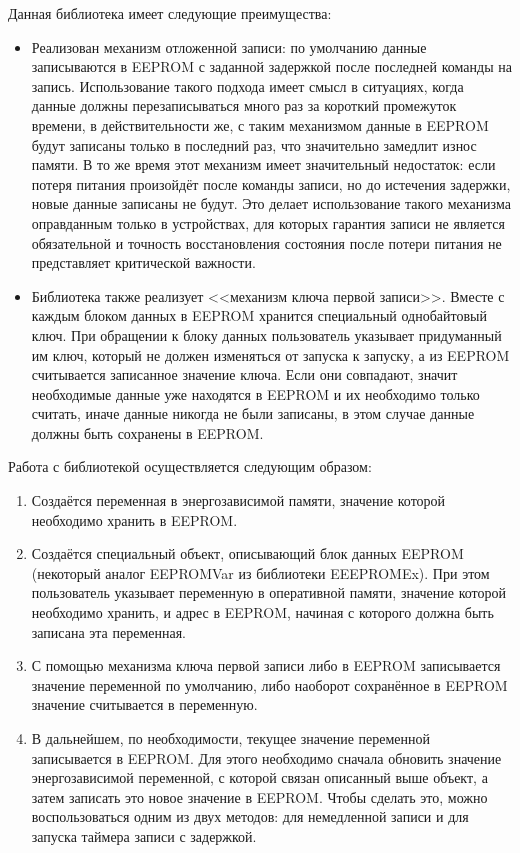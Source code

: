 Данная библиотека имеет следующие преимущества:
\begin{itemize}
	\item Реализован механизм отложенной записи: по умолчанию данные записываются в EEPROM с заданной задержкой после последней команды на запись. Использование такого подхода имеет смысл в ситуациях, когда данные должны перезаписываться много раз за короткий промежуток времени, в действительности же, с таким механизмом данные в EEPROM будут записаны только в последний раз, что значительно замедлит износ памяти. В то же время этот механизм имеет значительный недостаток: если потеря питания произойдёт после команды записи, но до истечения задержки, новые данные записаны не будут. Это делает использование такого механизма оправданным только в устройствах, для которых гарантия записи не является обязательной и точность восстановления состояния после потери питания не представляет критической важности.
	\item Библиотека также реализует <<механизм ключа первой записи>>. Вместе с каждым блоком данных в EEPROM хранится специальный однобайтовый ключ. При обращении к блоку данных пользователь указывает придуманный им ключ, который не должен изменяться от запуска к запуску, а из EEPROM считывается записанное значение ключа. Если они совпадают, значит необходимые данные уже находятся в EEPROM и их необходимо только считать, иначе данные никогда не были записаны, в этом случае данные должны быть сохранены в EEPROM.
\end{itemize}

Работа с библиотекой осуществляется следующим образом:
\begin{enumerate}
	\item Создаётся переменная в энергозависимой памяти, значение которой необходимо хранить в EEPROM.
	\item Создаётся специальный объект, описывающий блок данных EEPROM (некоторый аналог EEPROMVar из библиотеки EEEPROMEx).
	При этом пользователь указывает переменную в оперативной памяти, значение которой  необходимо хранить, и адрес в EEPROM, начиная с которого должна быть записана эта переменная.
	\item С помощью механизма ключа первой записи либо в EEPROM записывается значение переменной по умолчанию, либо наоборот сохранённое в EEPROM значение считывается в переменную.
	\item В дальнейшем, по необходимости, текущее значение переменной записывается в EEPROM.
	Для этого необходимо сначала обновить значение энергозависимой переменной, с которой связан описанный выше объект, а затем записать это новое значение в EEPROM.
	Чтобы сделать это, можно воспользоваться одним из двух методов: для немедленной записи и для запуска таймера записи с задержкой.
\end{enumerate}

